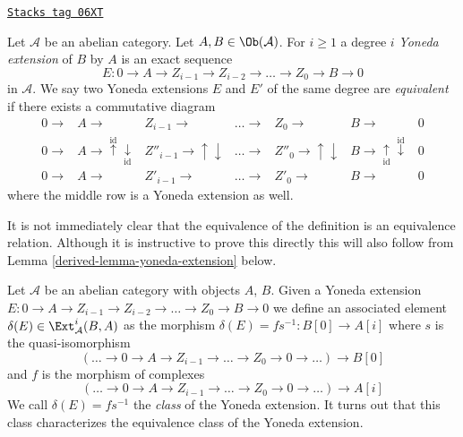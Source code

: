 \begin{definition}
\label{derived-definition-yoneda-extension}
\href{https://stacks.math.columbia.edu/tag/06XT}{\texttt{Stacks tag 06XT}}

Let $\mathcal{A}$ be an abelian category. Let $A, B \in \Ob(\mathcal{A})$.
For $i \geq 1$ a degree $i$ {\it Yoneda extension} of $B$ by $A$ is an
exact sequence
$$
E : 0 \to A \to Z_{i - 1} \to Z_{i - 2} \to \ldots \to Z_0 \to B \to 0
$$
in $\mathcal{A}$. We say two Yoneda extensions $E$ and $E'$ of the same degree
are {\it equivalent} if there exists a commutative diagram
$$
\begin{array}{ccccccc}0 \longrightarrow & A \longrightarrow & Z_{i - 1} \longrightarrow & \ldots \longrightarrow & Z_0 \longrightarrow & B \longrightarrow & 0 \\ 0 \longrightarrow & A \longrightarrow\overset{\text{id}}{\uparrow}\underset{\text{id}}{\downarrow} & Z''_{i - 1} \longrightarrow\uparrow\downarrow & \ldots \longrightarrow & Z''_0 \longrightarrow\uparrow\downarrow & B \longrightarrow\underset{\text{id}}{\uparrow}\overset{\text{id}}{\downarrow} & 0 \\ 0 \longrightarrow & A \longrightarrow & Z'_{i - 1} \longrightarrow & \ldots \longrightarrow & Z'_0 \longrightarrow & B \longrightarrow & 0\end{array}
$$
where the middle row is a Yoneda extension as well.
\end{definition}

It is not immediately clear that the equivalence of the definition is
an equivalence relation. Although it is instructive to prove this directly
this will also follow from
Lemma \ref{derived-lemma-yoneda-extension}
below.

\medskip\noindent
Let $\mathcal{A}$ be an abelian category with objects $A$, $B$.
Given a Yoneda extension
$E : 0 \to A \to Z_{i - 1} \to Z_{i - 2} \to \ldots \to Z_0 \to B \to 0$
we define an associated element $\delta(E) \in \Ext^i_\mathcal{A}(B, A)$
as the morphism $\delta(E) = fs^{-1} : B[0] \to A[i]$ where
$s$ is the quasi-isomorphism
$$
(\ldots \to 0 \to A \to Z_{i - 1} \to \ldots \to Z_0 \to 0 \to \ldots)
\longrightarrow
B[0]
$$
and $f$ is the morphism of complexes
$$
(\ldots \to 0 \to A \to Z_{i - 1} \to \ldots \to Z_0 \to 0 \to \ldots)
\longrightarrow
A[i]
$$
We call $\delta(E) = fs^{-1}$ the {\it class} of the Yoneda extension.
It turns out that this class characterizes the equivalence class
of the Yoneda extension.

